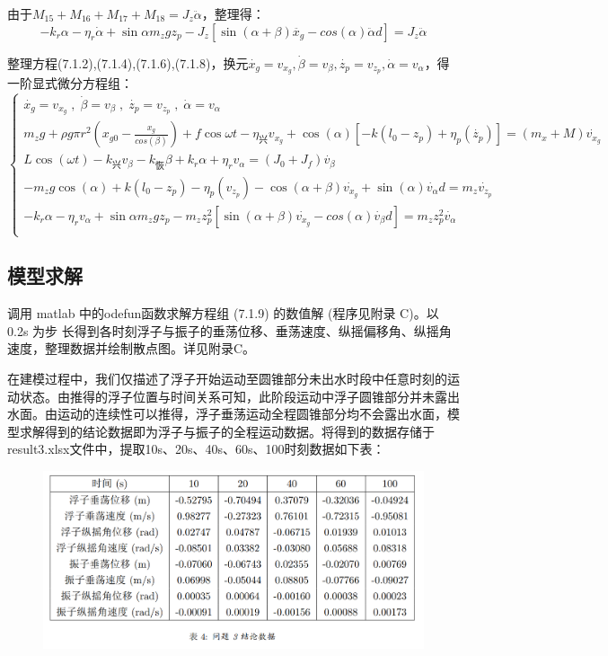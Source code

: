 \documentclass{article}
\numberwithin{equation}{subsection}
\begin{document}
由于$M_{15}+M_{16}+M_{17}+M_{18}=J_z\ddot{\alpha}$，整理得：
\begin{equation}
    -k_r\alpha-\eta_r\dot{\alpha}+\sin{\alpha}m_zgz_p-J_z[\sin(\alpha+\beta)\ddot{x_g}-cos(\alpha)\ddot{\alpha}d]=J_z\ddot{\alpha}
\end{equation}

整理方程(7.1.2),(7.1.4),(7.1.6),(7.1.8)，换元$\dot{x_g}=v_{x_g},\dot{\beta}=v_{\beta},\dot{z_p}=v_{z_p},\dot{\alpha}=v_{\alpha} $，得一阶显式微分方程组：
\begin{equation}
\left\{\begin{array}{l}
    \dot{x_g}=v_{x_g}\;,\;\dot{\beta}=v_{\beta}\;,\;\dot{z_p}=v_{z_p}\;,\;\dot{\alpha}=v_{\alpha} \\
    m_{z} g+\rho g \pi r^{2}\left(x_{g0}-\frac{x_g}{cos(\beta)}\right)+f \cos \omega t-\eta_{\text{兴}}v_{x_g}+\cos(\alpha)[-k\left(l_{0}-z_p\right)+\eta_{p}(\dot{z_p})]=\left(m_{x}+M\right) \dot{v_{x_g}}\\
    L\cos(\omega t)-k_{兴}v_{\beta}-k_{恢}\beta+k_r\alpha+\eta_rv_{\alpha}=(J_0+J_f)\dot{v_\beta}\\
    -m_{z} g\cos(\alpha)+k\left(l_{0}-z_p\right)-\eta_{p}(v_{z_p})-\cos(\alpha+\beta)\dot{v_{x_g}}+\sin(\alpha)\dot{v_{\alpha}}d=m_{z} \dot{v_{z_p}}\\
    -k_r\alpha-\eta_rv_{\alpha}+\sin{\alpha}m_zgz_p-m_zz_p^2[\sin(\alpha+\beta)\dot{v_{x_g}}-cos(\alpha)\dot{v_{\beta}}d]=m_zz_p^2\dot{v_{\alpha}}\\
\end{array}\right.
\end{equation}


\subsection{模型求解}
调用 matlab 中的odefun函数求解方程组 (7.1.9) 的数值解 (程序见附录 C)。以 0.2s 为步
长得到各时刻浮子与振子的垂荡位移、垂荡速度、纵摇偏移角、纵摇角速度，整理数据并绘制散点图。详见附录C。


在建模过程中，我们仅描述了浮子开始运动至圆锥部分未出水时段中任意时刻的运动状态。由推得的浮子位置与时间关系可知，此阶段运动中浮子圆锥部分并未露出水面。由运动的连续性可以推得，浮子垂荡运动全程圆锥部分均不会露出水面，模型求解得到的结论数据即为浮子与振子的全程运动数据。将得到的数据存储于result3.xlsx文件中，提取10s、20s、40s、60s、100时刻数据如下表：


\begin{figure}[H]
    \centering
    \includegraphics[scale=0.5]{问题3结论表.png}
\end{figure}
\end{document}
